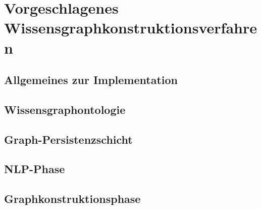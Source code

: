 %
\chapter{Vorgeschlagenes Wissensgraphkonstruktionsverfahren}
\label{sec:text2kg}

\section{Allgemeines zur Implementation}
\label{sec:text2kg:implementation}

\section{Wissensgraphontologie}
\label{sec:text2kg:ontology}

\section{Graph-Persistenzschicht}
\label{sec:text2kg:persistency}

\section{NLP-Phase}
\label{sec:text2kg:nlp}

\section{Graphkonstruktionsphase}
\label{sec:text2kg:psl}
